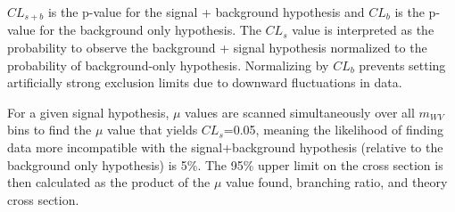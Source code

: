 $CL_{s+b}$ is the p-value for the signal + background hypothesis and $CL_{b}$ is the p-value for the background only hypothesis. The $CL_{s}$ value is interpreted as the probability to observe the background + signal hypothesis normalized to the probability of background-only hypothesis. Normalizing by $CL_{b}$ prevents setting artificially strong exclusion limits due to downward fluctuations in data. 

For a given signal hypothesis, $\mu$ values are scanned simultaneously over all $m_{WV}$ bins to find the $\mu$ value that yields $CL_{s}$=0.05, meaning the likelihood of finding data more incompatible with the signal+background hypothesis (relative to the background only hypothesis) is 5\%. The 95\% upper limit on the cross section is then calculated as the product of the $\mu$ value found, branching ratio, and theory cross section.







